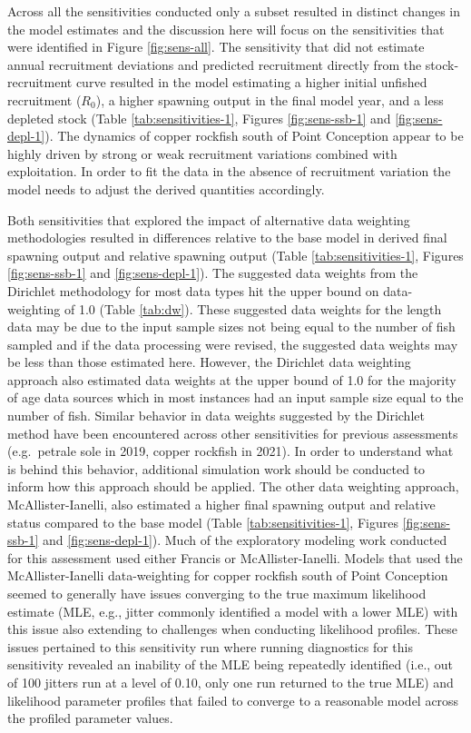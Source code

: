 \documentclass[11pt,
  english,
  letterpaper,
]{article}
\begin{document}
Across all the sensitivities conducted only a subset resulted in distinct changes in the model estimates and the discussion here will focus on the sensitivities that were identified in Figure \ref{fig:sens-all}. The sensitivity that did not estimate annual recruitment deviations and predicted recruitment directly from the stock-recruitment curve resulted in the model estimating a higher initial unfished recruitment (\(R_0\)), a higher spawning output in the final model year, and a less depleted stock (Table \ref{tab:sensitivities-1}, Figures \ref{fig:sens-ssb-1} and \ref{fig:sens-depl-1}). The dynamics of copper rockfish south of Point Conception appear to be highly driven by strong or weak recruitment variations combined with exploitation. In order to fit the data in the absence of recruitment variation the model needs to adjust the derived quantities accordingly.

Both sensitivities that explored the impact of alternative data weighting methodologies resulted in differences relative to the base model in derived final spawning output and relative spawning output (Table \ref{tab:sensitivities-1}, Figures \ref{fig:sens-ssb-1} and \ref{fig:sens-depl-1}). The suggested data weights from the Dirichlet methodology for most data types hit the upper bound on data-weighting of 1.0 (Table \ref{tab:dw}). These suggested data weights for the length data may be due to the input sample sizes not being equal to the number of fish sampled and if the data processing were revised, the suggested data weights may be less than those estimated here. However, the Dirichlet data weighting approach also estimated data weights at the upper bound of 1.0 for the majority of age data sources which in most instances had an input sample size equal to the number of fish. Similar behavior in data weights suggested by the Dirichlet method have been encountered across other sensitivities for previous assessments (e.g.~petrale sole in 2019, copper rockfish in 2021). In order to understand what is behind this behavior, additional simulation work should be conducted to inform how this approach should be applied. The other data weighting approach, McAllister-Ianelli, also estimated a higher final spawning output and relative status compared to the base model (Table \ref{tab:sensitivities-1}, Figures \ref{fig:sens-ssb-1} and \ref{fig:sens-depl-1}). Much of the exploratory modeling work conducted for this assessment used either Francis or McAllister-Ianelli. Models that used the McAllister-Ianelli data-weighting for copper rockfish south of Point Conception seemed to generally have issues converging to the true maximum likelihood estimate (MLE, e.g., jitter commonly identified a model with a lower MLE) with this issue also extending to challenges when conducting likelihood profiles. These issues pertained to this sensitivity run where running diagnostics for this sensitivity revealed an inability of the MLE being repeatedly identified (i.e., out of 100 jitters run at a level of 0.10, only one run returned to the true MLE) and likelihood parameter profiles that failed to converge to a reasonable model across the profiled parameter values.
\end{document}

